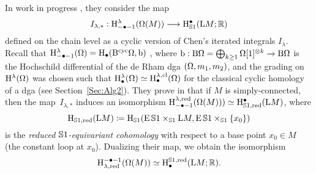 \documentclass[\MainFolder/Text.tex]{subfiles}
\begin{document}

In work in progress \cite{Cieliebak2018b}, they consider the map 
$$I_{\lambda,*}: \mathrm{H}^{\lambda}_{-\bullet- 1}(\Omega(M)) \longrightarrow \mathrm{H}_{\mathbb{S}{1}}^\bullet(\mathrm{L} M; \mathbb{R})$$ defined on the chain level as a cyclic version of Chen's iterated integrals $I_\lambda$. Recall that $\mathrm{H}^{\lambda}_{-\bullet-1}(\Omega) = \mathrm{H}_\bullet(\mathrm{B}^{\mathrm{cyc}} \Omega, \mathrm{b})$ ,
where $\mathrm{b}: \mathrm{B} \Omega = \bigoplus_{k\ge 1} \Omega[1]^{\otimes k} \rightarrow \mathrm{B} \Omega $ is the Hochschild differential of the de Rham dga $(\Omega,m_1,m_2)$, and the grading on $\mathrm{H}^{\lambda}(\Omega)$ was chosen such that $\mathrm{H}^{\lambda}_\bullet(\Omega) \simeq \mathrm{H}^{\lambda,\mathrm{cl}}_\bullet(\Omega)$ for the classical cyclic homology of a dga (see Section~\ref{Sec:Alg2}). They prove in \cite{Cieliebak2018b} that if $M$ is simply-connected, then the map~$I_{\lambda,*}$ induces an isomorphism $\mathrm{H}^{\lambda,\mathrm{red}}_{-\bullet-1}(\Omega(M))) \simeq \mathrm{H}_{\mathbb{S}{1}, \mathrm{red}}^\bullet(\mathrm{L} M)$, where 
$$ \mathrm{H}_{\mathbb{S}{1}, \mathrm{red}}(\mathrm{L} M) \coloneqq \mathrm{H}_{\mathbb{S}{1}}(\operatorname{E} \mathbb{S}{1} \times_{\mathbb{S}{1}} \mathrm{L} M, \operatorname{E} \mathbb{S}{1} \times_{\mathbb{S}{1}} \{x_0\}) $$
is the \emph{reduced $\mathbb{S}{1}$-equivariant cohomology} with respect to a base point $x_0 \in M$ (the constant loop at $x_0$). Dualizing their map, we obtain the isomorphism 
\begin{equation}\label{Eq:StringIsom}
\mathrm{H}_{\lambda,\mathrm{red}}^{-\bullet-1}(\Omega(M))\simeq \mathrm{H}^{\mathbb{S}{1}, \mathrm{red}}_\bullet(\mathrm{L} M; \mathbb{R}).
\end{equation}

\end{document}
